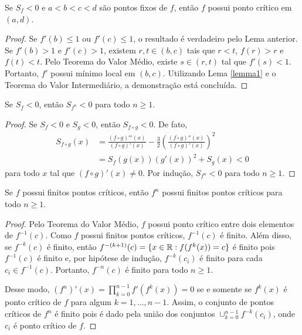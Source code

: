 \begin{lemma}
\label{lemma3}
Se $S_f < 0$ e $a<b<c<d$ são pontos fixos de $f$, então $f$ possui ponto crítico em $(a,d)$.
\end{lemma}

\begin{proof}
Se $f'(b) \leq 1$ ou $f'(c) \leq 1$, o resultado é verdadeiro pelo Lema anterior. Se $f'(b) > 1$ e $f'(c) > 1$, existem $r, t \in (b,c)$ tais que $r<t$, $f(r) > r$ e $f(t) < t$. Pelo Teorema do Valor Médio, existe $s \in (r,t)$ tal que $f'(s) < 1$. Portanto, $f'$ possui mínimo local em $(b,c)$. Utilizando Lema \ref{lemma1} e o Teorema do Valor Intermediário, a demonstração está concluída.
\end{proof}

\begin{lemma}
Se $S_f < 0$, então $S_{f^n} < 0$ para todo $n \geq 1$.
\end{lemma}

\begin{proof}
Se $S_f < 0$ e $S_g < 0$, então $S_{f \circ g} < 0$. De fato,
\begin{align*}
S_{f \circ g}(x) & = \frac{(f \circ g)'''(x)}{(f \circ g)'(x)} - \frac{3}{2} \left( \frac{(f \circ g)''(x)}{(f \circ g)'(x)} \right)^2 \\
& = S_f(g(x)) (g'(x))^2 + S_g(x) < 0
\end{align*}
para todo $x$ tal que $(f \circ g)'(x) \neq 0$. Por indução, $S_{f^n} < 0$ para todo $n \geq 1$.
\end{proof}

\begin{lemma}
Se $f$ possui finitos pontos críticos, então $f^n$ possui finitos pontos críticos para todo $n \geq 1$.
\end{lemma}
\begin{proof}

Pelo Teorema do Valor Médio, $f$ possui ponto crítico entre dois elementos de $f^{-1}(c)$. Como $f$ possui finitos pontos críticos, $f^{-1}(c)$ é finito. Além disso, se $f^{-k}(c)$ é finito, então $f^{-(k+1)}(c) = \{ x \in \mathbb{R} : f(f^k(x)) = c \}$ é finito pois $f^{-1}(c)$ é finito e, por hipótese de indução, $f^{-k}(c_ i)$ é finito para cada $c_i \in f^{-1}(c)$. Portanto, $f^{-n}(c)$ é finito para todo $n \geq 1$.

Desse modo, $(f^n)'(x) = \prod_{k=0}^{n-1} f'(f^k(x)) = 0$ se e somente se $f^k(x)$ é ponto crítico de $f$ para algum $k = 1, \dots, n-1$. Assim, o conjunto de pontos críticos de $f^n$ é finito pois é dado pela união dos conjuntos $\cup_{k=0}^{n-1} f^{-k}(c_i)$, onde $c_i$ é ponto crítico de $f$.
\end{proof}

